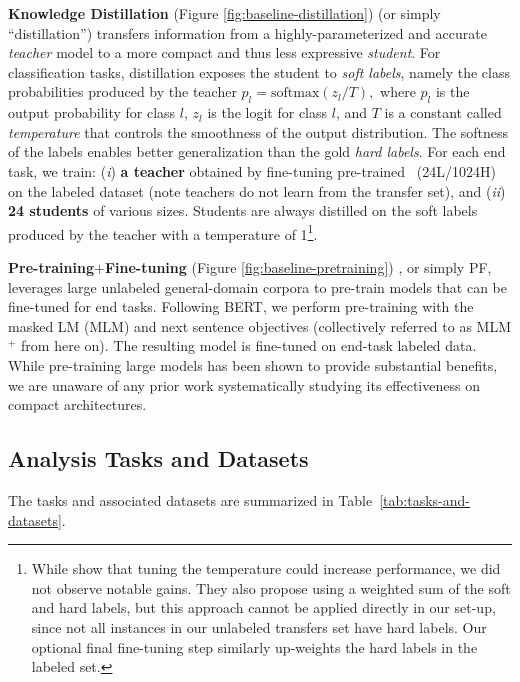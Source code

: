 \textbf{Knowledge Distillation} (Figure \ref{fig:baseline-distillation}) \citep{model-compression,distillation} (or simply ``distillation'') transfers information from a highly-parameterized and accurate \emph{teacher} model to a more compact and thus less expressive \emph{student}. For classification tasks, distillation exposes the student to \emph{soft labels}, namely the class probabilities produced by the teacher 
$p_l = \mbox{softmax}(z_l/T),$
where $p_l$ is the output probability for class $l$, $z_l$ is the logit for class $l$, and $T$ is a constant called \emph{temperature} that controls the smoothness of the output distribution. The softness of the labels enables better generalization than the gold \emph{hard labels}. For each end task, we train: (\textit{i})
    \textbf{a teacher} obtained by fine-tuning pre-trained \bertlarge\ (24L/1024H) on the labeled dataset (note teachers do not learn from the  transfer set), and (\textit{ii}) \textbf{24 students} of various sizes. %
    Students are always distilled on the soft labels produced by the teacher with a temperature of 1\footnote{While \citet{distillation} show that tuning the temperature could increase performance, we did not observe notable gains. They also propose using a weighted sum of the soft and hard labels, but this approach cannot be applied directly in our set-up, since not all instances in our unlabeled transfers set have hard labels. Our optional final fine-tuning step similarly up-weights the hard labels in the labeled set. }.

\textbf{Pre-training$+$Fine-tuning} (Figure \ref{fig:baseline-pretraining}) \citep{first-finetuned-pretraining,bert}, or simply PF, leverages large unlabeled general-domain corpora to pre-train models that can be fine-tuned for end tasks. Following BERT, we perform pre-training with the masked LM (MLM) and next sentence objectives (collectively referred to as MLM$^+$ from here on). The resulting model is fine-tuned on end-task labeled data. While pre-training large models has been shown to provide substantial benefits, we are unaware of any prior work systematically studying its effectiveness on compact architectures.

\subsection{Analysis Tasks and Datasets}
\label{sec:tasks-and-datasets}

The tasks and associated datasets are summarized in Table~\ref{tab:tasks-and-datasets}.

